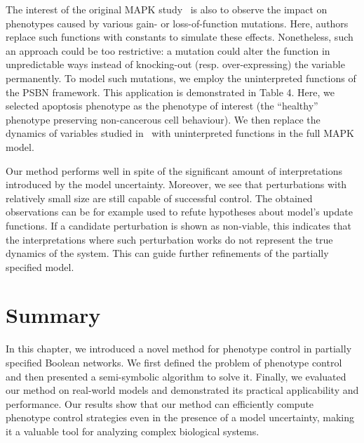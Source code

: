The interest of the original MAPK study~\cite{Grieco2013} is also to observe the impact on phenotypes caused by various gain- or loss-of-function mutations. Here, authors replace such functions with constants to simulate these effects. Nonetheless, such an approach could be too restrictive: a mutation could alter the function in unpredictable ways instead of knocking-out (resp. over-expressing) the variable permanently. To model such mutations, we employ the uninterpreted functions of the PSBN framework. This application is demonstrated in Table 4. Here, we selected apoptosis phenotype as the phenotype of interest (the “healthy” phenotype preserving non-cancerous cell behaviour). We then replace the dynamics of variables studied in~\cite{Grieco2013} with uninterpreted functions in the full MAPK model.

Our method performs well in spite of the significant amount of interpretations introduced by the model uncertainty. Moreover, we see that perturbations with relatively small size are still capable of successful control. The obtained observations can be for example used to refute hypotheses about model’s update functions. If a candidate perturbation is shown as non-viable, this indicates that the interpretations where such perturbation works do not represent the true dynamics of the system. This can guide further refinements of the partially specified model.






\section{Summary}

In this chapter, we introduced a novel method for phenotype control in partially specified Boolean networks. We first defined the problem of phenotype control and then presented a semi-symbolic algorithm to solve it. Finally, we evaluated our method on real-world models and demonstrated its practical applicability and performance. Our results show that our method can efficiently compute phenotype control strategies even in the presence of a model uncertainty, making it a valuable tool for analyzing complex biological systems.

